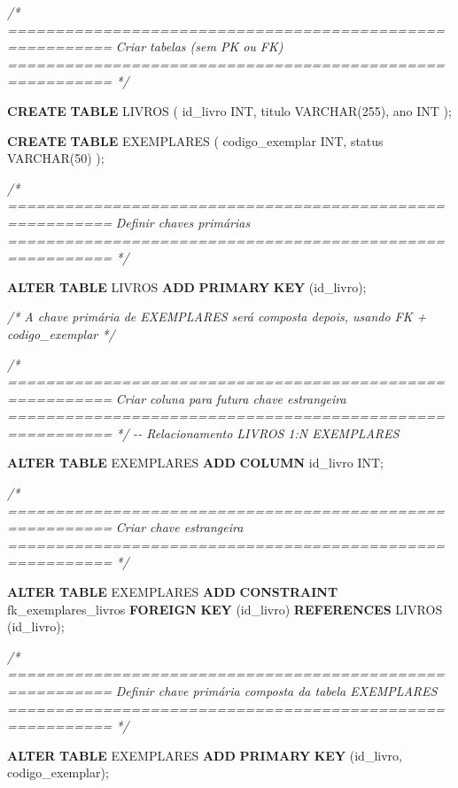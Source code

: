 \documentclass[
]{book}
\newenvironment{Shaded}{\begin{snugshade}}{\end{snugshade}}
\newcommand{\CommentTok}[1]{\textcolor[rgb]{0.56,0.35,0.01}{\textit{#1}}}
\newcommand{\DataTypeTok}[1]{\textcolor[rgb]{0.13,0.29,0.53}{#1}}
\newcommand{\DecValTok}[1]{\textcolor[rgb]{0.00,0.00,0.81}{#1}}
\newcommand{\KeywordTok}[1]{\textcolor[rgb]{0.13,0.29,0.53}{\textbf{#1}}}
\newcommand{\NormalTok}[1]{#1}
\begin{document}
\begin{Shaded}
\begin{Highlighting}[]
\CommentTok{/* =========================================================}
\CommentTok{   Criar tabelas (sem PK ou FK)}
\CommentTok{   ========================================================= */}

\KeywordTok{CREATE} \KeywordTok{TABLE}\NormalTok{ LIVROS }
\NormalTok{(}
\NormalTok{    id\_livro }\DataTypeTok{INT}\NormalTok{,}
\NormalTok{    titulo }\DataTypeTok{VARCHAR}\NormalTok{(}\DecValTok{255}\NormalTok{),}
\NormalTok{    ano }\DataTypeTok{INT}
\NormalTok{);}

\KeywordTok{CREATE} \KeywordTok{TABLE}\NormalTok{ EXEMPLARES }
\NormalTok{(}
\NormalTok{    codigo\_exemplar }\DataTypeTok{INT}\NormalTok{,}
\NormalTok{    status }\DataTypeTok{VARCHAR}\NormalTok{(}\DecValTok{50}\NormalTok{)}
\NormalTok{);}

\CommentTok{/* =========================================================}
\CommentTok{   Definir chaves primárias}
\CommentTok{   ========================================================= */}

\KeywordTok{ALTER} \KeywordTok{TABLE}\NormalTok{ LIVROS }\KeywordTok{ADD} \KeywordTok{PRIMARY} \KeywordTok{KEY}\NormalTok{ (id\_livro);}

\CommentTok{/* A chave primária de EXEMPLARES será composta depois, usando FK + codigo\_exemplar */}

\CommentTok{/* =========================================================}
\CommentTok{   Criar coluna para futura chave estrangeira}
\CommentTok{   ========================================================= */}
\CommentTok{{-}{-} Relacionamento LIVROS 1:N EXEMPLARES}

\KeywordTok{ALTER} \KeywordTok{TABLE}\NormalTok{ EXEMPLARES }\KeywordTok{ADD} \KeywordTok{COLUMN}\NormalTok{ id\_livro }\DataTypeTok{INT}\NormalTok{;}

\CommentTok{/* =========================================================}
\CommentTok{   Criar chave estrangeira}
\CommentTok{   ========================================================= */}

\KeywordTok{ALTER} \KeywordTok{TABLE}\NormalTok{ EXEMPLARES }\KeywordTok{ADD} \KeywordTok{CONSTRAINT}\NormalTok{ fk\_exemplares\_livros }\KeywordTok{FOREIGN} \KeywordTok{KEY}\NormalTok{ (id\_livro) }\KeywordTok{REFERENCES}\NormalTok{ LIVROS (id\_livro);}

\CommentTok{/* =========================================================}
\CommentTok{   Definir chave primária composta da tabela EXEMPLARES}
\CommentTok{   ========================================================= */}

\KeywordTok{ALTER} \KeywordTok{TABLE}\NormalTok{ EXEMPLARES }\KeywordTok{ADD} \KeywordTok{PRIMARY} \KeywordTok{KEY}\NormalTok{ (id\_livro, codigo\_exemplar);}
\end{Highlighting}
\end{Shaded}
\end{document}

